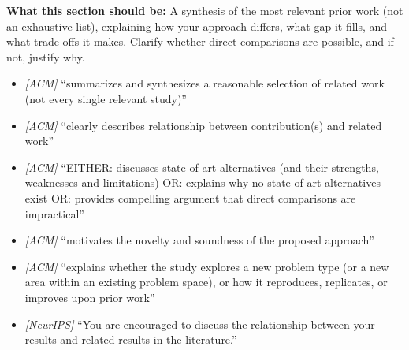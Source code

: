 \noindent\textbf{What this section should be:}
A synthesis of the most relevant prior work (not an exhaustive list), explaining how your approach differs, what gap it fills, and what trade-offs it makes. Clarify whether direct comparisons are possible, and if not, justify why.
\begin{itemize}
  \item \textit{[ACM]} ``summarizes and synthesizes a reasonable selection of related work (not every single relevant study)''
  \item \textit{[ACM]} ``clearly describes relationship between contribution(s) and related work''
  \item \textit{[ACM]} ``EITHER: discusses state-of-art alternatives (and their strengths, weaknesses and limitations) OR: explains why no state-of-art alternatives exist OR: provides compelling argument that direct comparisons are impractical''
  \item \textit{[ACM]} ``motivates the novelty and soundness of the proposed approach''
  \item \textit{[ACM]} ``explains whether the study explores a new problem type (or a new area within an existing problem space), or how it reproduces, replicates, or improves upon prior work''
  \item \textit{[NeurIPS]} ``You are encouraged to discuss the relationship between your results and related results in the literature.''
\end{itemize}